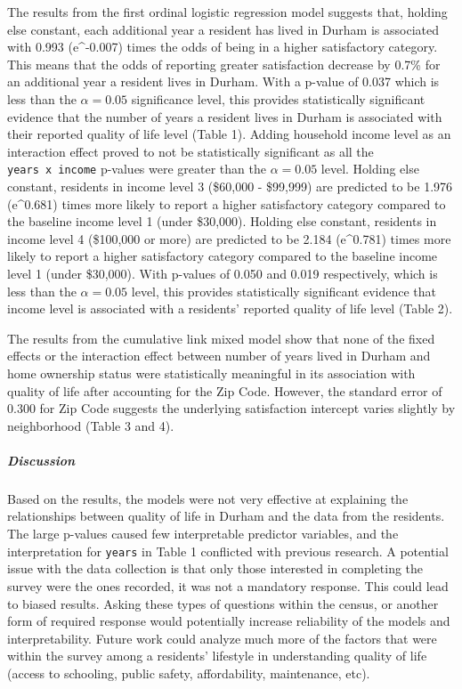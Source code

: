 \documentclass[
  4pt,
]{article}
\begin{document}
The results from the first ordinal logistic regression model suggests
that, holding else constant, each additional year a resident has lived
in Durham is associated with 0.993 (e\^{}-0.007) times the odds of being
in a higher satisfactory category. This means that the odds of reporting
greater satisfaction decrease by 0.7\% for an additional year a resident
lives in Durham. With a p-value of 0.037 which is less than the
\(\alpha = 0.05\) significance level, this provides statistically
significant evidence that the number of years a resident lives in Durham
is associated with their reported quality of life level (Table 1).
Adding household income level as an interaction effect proved to not be
statistically significant as all the \texttt{years\ x\ income} p-values
were greater than the \(\alpha = 0.05\) level. Holding else constant,
residents in income level 3 (\$60,000 - \$99,999) are predicted to be
1.976 (e\^{}0.681) times more likely to report a higher satisfactory
category compared to the baseline income level 1 (under \$30,000).
Holding else constant, residents in income level 4 (\$100,000 or more)
are predicted to be 2.184 (e\^{}0.781) times more likely to report a
higher satisfactory category compared to the baseline income level 1
(under \$30,000). With p-values of 0.050 and 0.019 respectively, which
is less than the \(\alpha = 0.05\) level, this provides statistically
significant evidence that income level is associated with a residents'
reported quality of life level (Table 2).

The results from the cumulative link mixed model show that none of the
fixed effects or the interaction effect between number of years lived in
Durham and home ownership status were statistically meaningful in its
association with quality of life after accounting for the Zip Code.
However, the standard error of 0.300 for Zip Code suggests the
underlying satisfaction intercept varies slightly by neighborhood (Table
3 and 4).

\subparagraph{Discussion}\label{discussion}

Based on the results, the models were not very effective at explaining
the relationships between quality of life in Durham and the data from
the residents. The large p-values caused few interpretable predictor
variables, and the interpretation for \texttt{years} in Table 1
conflicted with previous research. A potential issue with the data
collection is that only those interested in completing the survey were
the ones recorded, it was not a mandatory response. This could lead to
biased results. Asking these types of questions within the census, or
another form of required response would potentially increase reliability
of the models and interpretability. Future work could analyze much more
of the factors that were within the survey among a residents' lifestyle
in understanding quality of life (access to schooling, public safety,
affordability, maintenance, etc).
\end{document}
